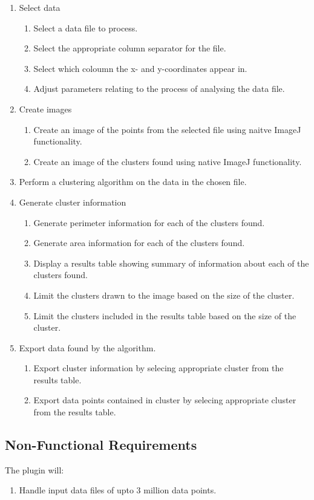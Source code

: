 \begin{enumerate}
	\item Select data
		\begin{enumerate}
			\item Select a data file to process.
			\item Select the appropriate column separator for the file.
			\item Select which coloumn the x- and y-coordinates appear in.
			\item Adjust parameters relating to the process of analysing the
				data file.
		\end{enumerate}
	\item Create images
		\begin{enumerate}
			\item Create an image of the points from the selected file using
				naitve ImageJ functionality.
			\item Create an image of the clusters found using native ImageJ
				functionality.
		\end{enumerate}
	\item Perform a clustering algorithm on the data in the chosen file.
	\item Generate cluster information
		\begin{enumerate}
			\item Generate perimeter information for each of the clusters found.
			\item Generate area information for each of the clusters found.
			\item Display a results table showing summary of information about each of the clusters found.
			\item Limit the clusters drawn to the image based on the size of the cluster.
			\item Limit the clusters included in the results table based on the size of the cluster.
		\end{enumerate}
	\item Export data found by the algorithm.
		\begin{enumerate}
			\item Export cluster information by selecing appropriate cluster from the results table.
			\item Export data points contained in cluster by selecing appropriate cluster from the results table.
		\end{enumerate}
\end{enumerate}

\subsection{Non-Functional Requirements}
\label{sub:non_functional_requirements}


The plugin will:

\begin{enumerate}
	\item Handle input data files of upto 3 million data points.
\end{enumerate}

\restoregeometry
